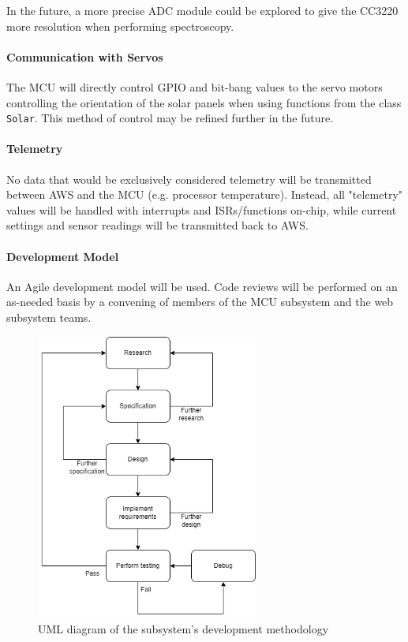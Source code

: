 In the future, a more precise ADC module could be explored to give the
CC3220 more resolution when performing spectroscopy.

\paragraph{Communication with Servos}
The MCU will directly control GPIO and bit-bang values to the servo motors
controlling the orientation of the solar panels when using functions from
the class \texttt{Solar}. This method of control may be refined further in
the future.

\paragraph{Telemetry}
No data that would be exclusively considered telemetry will be transmitted 
between AWS and the MCU (e.g. processor temperature). Instead, all
"telemetry" values will be handled with interrupts and ISRs/functions
on-chip, while current settings and sensor readings will be transmitted
back to AWS.

\paragraph{Development Model}
An Agile development model will be used. Code reviews will be performed on
an as-needed basis by a convening of members of the MCU subsystem and the
web subsystem teams.
\begin{figure}[H]
    \caption{UML diagram of the subsystem's development methodology}
    \label{mcu_agile_uml}
    \centering
    \includegraphics[width=0.65\textwidth]{images/mcu_agile_uml.png}
\end{figure}

